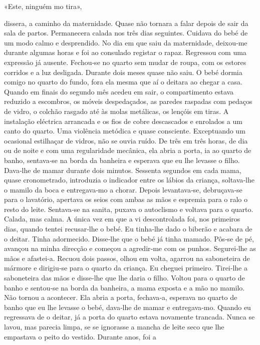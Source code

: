 «Este, ninguém mo tira»,

dissera, a caminho da maternidade. Quase não tornara a falar depois de
sair da sala de partos. Permanecera calada nos três dias seguintes.
Cuidava do bebé de um modo calmo e desprendido. No dia em que saiu da
maternidade, deixou­‑me durante algumas horas e foi ao consulado
registar o rapaz. Regressou com uma expressão já ausente. Fechou­‑se no
quarto sem mudar de roupa, com os estores corridos e a luz desligada.
Durante dois meses quase não saiu. O bebé dormia comigo no quarto do
fundo, fora ela mesma que aí o deitara ao chegar a casa. Quando em
finais do segundo mês acedeu em sair, o compartimento estava reduzido a
escombros, os móveis despedaçados, as paredes raspadas com pedaços de
vidro, o colchão rasgado até às molas metálicas, os lençóis em tiras. A
instalação eléctrica arrancada e os fios de cobre descascados e
enrolados a um canto do quarto. Uma violência metódica e quase
consciente. Exceptuando um ocasional estilhaçar de vidros, não se ouvia
ruído. De três em três horas, de dia ou de noite e com uma regularidade
mecânica, ela abria a porta, ia ao quarto de banho, sentava­‑se na borda
da banheira e esperava que eu lhe levasse o filho. Dava­‑lhe de mamar
durante dois minutos. Sessenta segundos em cada mama, quase
cronometrado, introduzia o indicador entre os lábios da criança,
soltava­‑lhe o mamilo da boca e entregava­‑mo a chorar. Depois
levantava­‑se, debruçava­‑se para o lavatório, apertava os seios com
ambas as mãos e espremia para o ralo o resto do leite. Sentava­‑se na
sanita, puxava o autoclismo e voltava para o quarto. Calada, mas calma.
A única vez em que a vi descontrolada foi, nos primeiros dias, quando
tentei recusar­‑lhe o bebé. Eu tinha­‑lhe dado o biberão e acabara de o
deitar. Tinha adormecido. Disse­‑lhe que o bebé já tinha mamado. Pôs­‑se
de pé, avançou na minha direcção e começou a agredir­‑me com os punhos.
Segurei­‑lhe as mãos e afastei­‑a. Recuou dois passos, olhou em volta,
agarrou na saboneteira de mármore e dirigiu­‑se para o quarto da
criança. Eu cheguei primeiro. Tirei­‑lhe a saboneteira das mãos e
disse­‑lhe que lhe daria o filho. Voltou para o quarto de banho e
sentou­‑se na borda da banheira, a mama exposta e a mão no mamilo. Não
tornou a acontecer. Ela abria a porta, fechava­‑a, esperava no quarto de
banho que eu lhe levasse o bebé, dava­‑lhe de mamar e entregava­‑mo.
Quando eu regressava de o deitar, já a porta do quarto estava novamente
trancada. Nunca se lavou, mas parecia limpa, se se ignorasse a mancha de
leite seco que lhe empastava o peito do vestido. Durante anos, foi a
